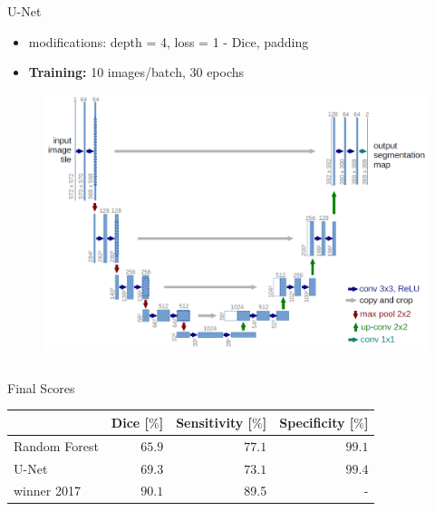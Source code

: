 \documentclass[final]{beamer}
\newlength{\onecolwid}
\newlength{\twocolwid}
\begin{document}
\begin{frame}[t]
\begin{columns}[t]
\begin{column}{\twocolwid}
\begin{columns}[t,totalwidth=\twocolwid]
\begin{column}{\onecolwid}
\begin{alertblock}{U-Net \cite{ronneberger2015u}}
\vspace*{12pt}
\begin{itemize}[label={}]
\item modifications: depth = 4, loss = 1 - Dice, padding
\item \textbf{Training:} 10 images/batch, 30 epochs
\end{itemize}
\begin{figure}
\centering
\includegraphics[width=0.9\linewidth]{u_net}
\end{figure}
\end{alertblock}

\end{column} %

\end{columns} %

\begin{alertblock}{Final Scores}
\centering
	\begin{tabular}{lrrr}
	\toprule
	 & Dice [$\%$] & Sensitivity [$\%$] & Specificity [$\%$] \\
	\midrule
	Random Forest & $\num{65.9}$ & $\num{77.1}$ & $\num{99.1}$ \\
	U-Net & $\num{69.3}$ & $\num{73.1}$ & $\num{99.4}$ \\
	winner 2017 \cite{brats2017short} & $\num{90.1}$ & \num{89.5} & - \\
	\bottomrule
	\end{tabular}
\end{alertblock}


\end{column}
\end{columns}
\end{frame}
\end{document}
